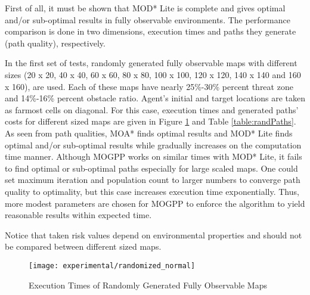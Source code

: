 First of all, it must be shown that MOD* Lite is complete and gives optimal and/or sub-optimal results in fully observable environments. The performance comparison is done in two dimensions, execution times and paths they generate (path quality), respectively.

In the first set of tests, randomly generated fully observable maps with different sizes (20 x 20, 40 x 40, 60 x 60, 80 x 80, 100 x 100, 120 x 120, 140 x 140 and 160 x 160), are used. Each of these maps have nearly 25\%-30\% percent threat zone and 14\%-16\% percent obstacle ratio. Agent's initial and target locations are taken as farmost cells on diagonal. For this case, execution times and generated paths' costs for different sized maps are given in Figure \ref{fig:rand_fully} and Table \ref{table:randPaths}. As seen from path qualities, MOA* finds optimal results and MOD* Lite finds optimal and/or sub-optimal results while gradually increases on the computation time manner. Although MOGPP works on similar times with MOD* Lite, it fails to find optimal or sub-optimal paths  especially for large scaled maps. One could set maximum iteration and population count to larger numbers to converge path quality to optimality, but this case increases execution time exponentially. Thus, more modest parameters are chosen for MOGPP to enforce the algorithm to yield reasonable results within expected time. 
 
Notice that taken risk values depend on environmental properties and should not be compared between different sized maps.

\begin{figure}
\centering
\texttt{[image: experimental/randomized\_normal]}
\caption{Execution Times of Randomly Generated Fully Observable Maps}
\label{fig:rand_fully}
\end{figure}

